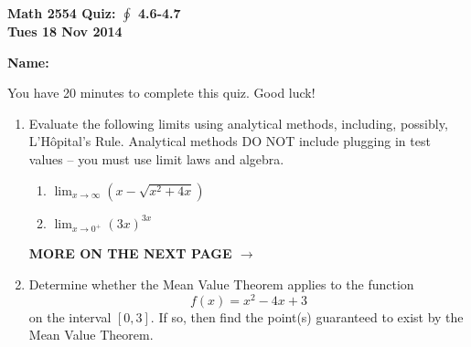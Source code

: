 \documentclass[11pt,letterpaper]{article}
\begin{document}
\flushleft
\begin{multicols}{2}

\begin{large}\textbf{Math 2554 Quiz: $\oint$ 4.6-4.7 \\
Tues 18 Nov 2014}\end{large}

\hfill\textbf{Name:  }\underline{\hspace{40ex}} %

\vspace{.5in}

\end{multicols}

\pagestyle{empty}

\flushleft
You have 20 minutes to complete this quiz.  Good luck!

\vspace{2pc}
\begin{enumerate}
\item Evaluate the following limits using analytical methods, including, possibly, L'H\^opital's Rule.  Analytical methods DO NOT include plugging in test values -- you must use limit laws and algebra.

\vspace{1pc}
\begin{enumerate}
\item $\displaystyle\lim_{x\to\infty}\left(x-\sqrt{x^2+4x}\right)$

\vspace{17pc}
\item $\displaystyle\lim_{x\to0^+}\left(3x\right)^{3x}$

\end{enumerate}

\vfill
\hfill {\bf\Large MORE ON THE NEXT PAGE $\to$}
\newpage

\item Determine whether the Mean Value Theorem applies to the function
\[f(x)=x^2-4x+3\]
on the interval $\left[0,3\right]$.  If so, then find the point(s) guaranteed to exist by the Mean Value Theorem.

\end{enumerate}
\end{document}
